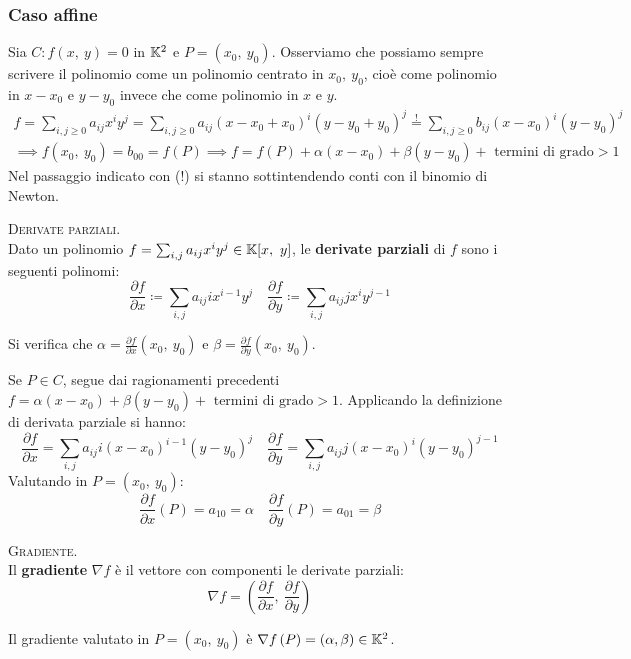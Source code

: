 \subsubsection{Caso affine}
Sia $C\colon f\left(x,\ y\right)=0$ in $\mathbb{K}^2$ e $P=(x_0,\ y_0)$. Osserviamo che possiamo sempre scrivere il polinomio come un polinomio centrato in $x_0,\ y_0$, cioè come polinomio in $x-x_0$ e $y-y_0$ invece che come polinomio in $x$ e $y$.
\begin{gather*}
		f=\sum_{i,j\geq 0} a_{ij}x^iy^j = \sum_{i,j\geq 0} a_{ij}(x-x_0+x_0)^i(y-y_0+y_0)^j \stackrel{!}{=} 	\sum_{i,j\geq 0}b_{ij}(x-x_0)^i(y-y_0)^j\\
		\implies f(x_0,\ y_0)=b_{00}=f\left(P\right) \implies f=f\left(P\right) +\alpha (x-x_0)+\beta (y-y_0)+ \text{ termini di grado} >1
\end{gather*}
Nel passaggio indicato con (!) si stanno sottintendendo conti con il binomio di Newton.\\
\begin{define}\textsc{Derivate parziali}.\\
	Dato un polinomio $f=\sum_{i,j}a_{ij}x^iy^j\in\mathbb{K}[x,\ y]$, le \textbf{derivate parziali} di $f$ sono i seguenti polinomi:
	\begin{equation}
		\frac{\partial{f}}{\partial{x}}\coloneqq \sum_{i,j}a_{ij}ix^{i-1}y^j\quad \frac{\partial{f}}{\partial{y}}\coloneqq \sum_{i,j}a_{ij}jx^iy^{j-1}
	\end{equation}
\vspace{-3mm}
\end{define}
Si verifica che $\alpha=\frac{\partial{f}}{\partial{x}}(x_0,\ y_0)$ e $\beta=\frac{\partial{f}}{\partial{y}}(x_0,\ y_0)$.
\begin{demonstration}
	Se $P\in C$, segue dai ragionamenti precedenti $f=\alpha (x-x_0)+\beta (y-y_0)+ \text{ termini di grado} >1$. Applicando la definizione di derivata parziale si hanno:
	\begin{equation*}
		\frac{\partial{f}}{\partial{x}}= \sum_{i,j}a_{ij}i\left(x-x_0\right)^{i-1}\left(y-y_0\right)^j\quad \frac{\partial{f}}{\partial{y}}= \sum_{i,j}a_{ij}j\left(x-x_0\right)^i\left(y-y_0\right)^{j-1}
	\end{equation*}
	Valutando in $P=(x_0,\ y_0)$:
	\begin{equation*}
		\frac{\partial{f}}{\partial{x}}\left(P\right)=a_{10}=\alpha\quad \frac{\partial{f}}{\partial{y}}\left(P\right)=a_{01}=\beta
	\end{equation*}
\end{demonstration}
\begin{define}\textsc{Gradiente}.\\
	Il \textbf{gradiente} $\nabla f$ è il vettore con componenti le derivate parziali:
	\begin{equation}
		\nabla f=\left( \frac{\partial{f}}{\partial{x}},\ \frac{\partial{f}}{\partial{y}} \right)
	\end{equation}
\vspace{-6mm}
\end{define}
Il gradiente valutato in $P=(x_0,\ y_0)$ è $\nabla f\left(P\right)=(\alpha,\beta)\in\mathbb{K}^2$.\\
